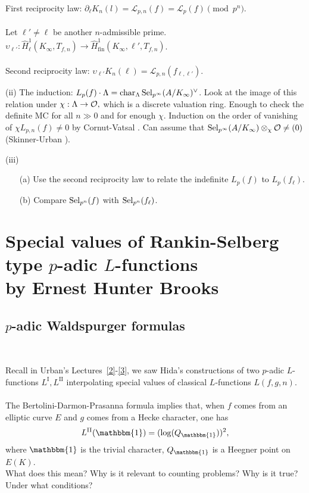 \documentclass[12pt,amsfont]{amsart}
\begin{document}
First reciprocity law: $\partial_\ell K_n(l) = \mathcal{L}_{p,n}(f) = \mathcal{L}_p(f) \pmod{p^n}$. \\ \\
Let $\ell' \ne  \ell$ be another $n$-admissible prime. $\upsilon_{\ell'} : \widehat{H}_{\ell}^1 (K_\infty, T_{f,n}) \rightarrow \widehat{H}_{\text{fin}}^1 (K_\infty, \ell', T_{f,n})$. \\ \\
Second reciprocity law: $\upsilon_{\ell'} K_n(\ell) = \mathcal{L}_{p,n}(f_{\ell,\ell'}).$ 

(ii) The induction: $L_p(f) \cdot \Lambda = \operatorname{char}_{\Lambda} \operatorname{Sel}_{p^\infty}(A/K_\infty)^\vee$. Look at the image of this relation under $\chi : \Lambda \rightarrow \mathcal{O},$ which is a discrete valuation ring. Enough to check the definite MC for all $n \gg 0$ and for enough $\chi$. Induction on the order of vanishing of $\chi L_{p,n}(f) \ne 0$ by Cornut-Vatsal . Can assume that $\operatorname{Sel}_{p^\infty}(A/K_\infty) \otimes_{\chi} \mathcal{O} \ne (0)$ (Skinner-Urban ). 

(iii) 
\begin{enumerate}
\item[(a)]
Use the second reciprocity law to relate the indefinite $L_p(f)$ to $L_p(f_\ell)$.
\item[(b)]
Compare $\operatorname{Sel}_{p^n}(f)$ with $\operatorname{Sel}_{p^n}(f_\ell)$.
\end{enumerate} 
\renewcommand{\thesubsection}{\arabic{section}.R}
\begingroup
\renewcommand{\addcontentsline}[3]{}%
\endgroup
\newpage
\section{Special values of Rankin-Selberg type $p$-adic $L$-functions \\
by Ernest Hunter Brooks}\label{11}
\renewcommand{\thesubsection}{\arabic{section}.\arabic{subsection}}

\subsection{$p$-adic Waldspurger formulas}
{\ }

Recall in Urban's Lectures~\ref{2}-\ref{3}, we saw Hida's constructions of two $p$-adic $L$-functions $L^{\text{I}}, L^{\text{II}}$ interpolating special values of classical $L$-functions $L(f,g,n)$. \\ \\
The Bertolini-Darmon-Prasanna formula  implies that, when $f$ comes from an elliptic curve $E$ and $g$ comes from a Hecke character, one has
\[L^{\text{II}}(\mathbbm{1}) = (\log (Q_{\mathbbm{1}}))^2,\]
where $\mathbbm{1}$ is the trivial character, $Q_{\mathbbm{1}}$ is a Heegner point on $E(K)$. \\
What does this mean? Why is it relevant to counting problems? Why is it true? Under what conditions? 
\end{document}
